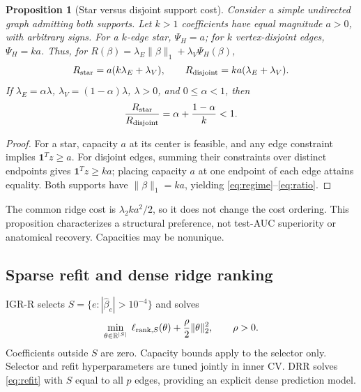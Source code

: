 \documentclass{article}
\newcommand{\R}{\mathbb{R}}
\newcommand{\one}{\mathbf{1}}
\newtheorem{proposition}{Proposition}
\begin{document}
\begin{proposition}[Star versus disjoint support cost]
\label{prop:star}
Consider a simple undirected graph admitting both supports. Let $k>1$ coefficients have equal magnitude $a>0$, with arbitrary signs. For a $k$-edge star, $\Psi_H=a$; for $k$ vertex-disjoint edges, $\Psi_H=ka$. Thus, for $R(\beta)=\lambda_E\|\beta\|_1+\lambda_V\Psi_H(\beta)$,
\begin{equation}
 R_{\rm star}=a(k\lambda_E+\lambda_V),\qquad
 R_{\rm disjoint}=ka(\lambda_E+\lambda_V).
 \label{eq:regime}
\end{equation}
If $\lambda_E=\alpha\lambda$, $\lambda_V=(1-\alpha)\lambda$, $\lambda>0$, and $0\le\alpha<1$, then
\begin{equation}
 \frac{R_{\rm star}}{R_{\rm disjoint}}
       =\alpha+\frac{1-\alpha}{k}<1.
 \label{eq:ratio}
\end{equation}
\end{proposition}
\begin{proof}
For a star, capacity $a$ at its center is feasible, and any edge constraint implies $\one^Tz\ge a$. For disjoint edges, summing their constraints over distinct endpoints gives $\one^Tz\ge ka$; placing capacity $a$ at one endpoint of each edge attains equality. Both supports have $\|\beta\|_1=ka$, yielding \eqref{eq:regime}--\eqref{eq:ratio}.
\end{proof}
The common ridge cost is $\lambda_2ka^2/2$, so it does not change the cost ordering. This proposition characterizes a structural preference, not test-AUC superiority or anatomical recovery. Capacities may be nonunique.

\subsection{Sparse refit and dense ridge ranking}
IGR-R selects $S=\{e:|\hat\beta_e|>10^{-4}\}$ and solves
\begin{equation}
 \min_{\theta\in\R^{|S|}}\;
 \ell_{{\rm rank},S}(\theta)+\frac\rho2\|\theta\|_2^2,
 \qquad \rho>0.
 \label{eq:refit}
\end{equation}
Coefficients outside $S$ are zero. Capacity bounds apply to the selector only. Selector and refit hyperparameters are tuned jointly in inner CV. DRR solves \eqref{eq:refit} with $S$ equal to all $p$ edges, providing an explicit dense prediction model.
\end{document}
